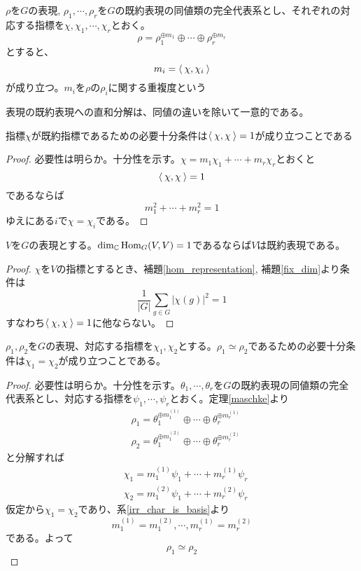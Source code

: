 \documentclass{ltjsreport}
\begin{document}
\begin{cor}\label{multiplicity}
  $\rho$を$G$の表現, $\rho_1,\cdots,\rho_r$を$G$の既約表現の同値類の完全代表系とし、それぞれの対応する指標を$\chi,\chi_1,\cdots,\chi_r$とおく。
  \[
  \rho=\rho_1^{\oplus m_1}\oplus\cdots\oplus\rho_r^{\oplus m_r}  
  \]
  とすると、
  \[
  m_i=\langle\:\chi,\chi_i\:\rangle
  \]
  が成り立つ。$m_i$を$\rho$の$\rho_i$に関する重複度という
\end{cor}

\begin{cor}
  表現の既約表現への直和分解は、同値の違いを除いて一意的である。
\end{cor}


\begin{cor}
  指標$\chi$が既約指標であるための必要十分条件は$\langle\:\chi,\chi\:\rangle=1$が成り立つことである
\end{cor}

\begin{proof}
  必要性は明らか。十分性を示す。$\chi=m_1\chi_1+\cdots+m_r\chi_r$とおくと
  \[
  \langle\:\chi,\chi\:\rangle=1  
  \]
  であるならば
  \[
  m_1^2+\cdots+m_r^2=1  
  \]
  ゆえにある$i$で$\chi=\chi_i$である。
\end{proof}

\begin{cor}[Schurの補題の逆]\label{reverse_schur}
  $V$を$G$の表現とする。$\dim_{\mathbb{C}}\text{Hom}_G(V,V)=1$であるならば$V$は既約表現である。
\end{cor}

\begin{proof}
  $\chi$を$V$の指標とするとき、補題\ref{hom_representation}, 補題\ref{fix_dim}より条件は
  \[
  \frac{1}{|G|}\sum_{g\in G}|\chi(g)|^2=1
  \]
  すなわち$\langle\:\chi,\chi\:\rangle=1$に他ならない。
\end{proof}



\begin{cor}\label{rep_and_char}
  $\rho_1,\rho_2$を$G$の表現、対応する指標を$\chi_1,\chi_2$とする。$\rho_1\simeq \rho_2$であるための必要十分条件は$\chi_1=\chi_2$が成り立つことである。
\end{cor}

\begin{proof}
  必要性は明らか。十分性を示す。$\theta_1,\cdots, \theta_r$を$G$の既約表現の同値類の完全代表系とし、対応する指標を$\psi_1,\cdots,\psi_r$とおく。定理\ref{maschke}より
  \begin{align*}
    &\rho_1=\theta_1^{\oplus m^{(1)}_1}\oplus\cdots\oplus\theta_r^{\oplus m^{(1)}_r}\\
    &\rho_2=\theta_1^{\oplus m^{(2)}_1}\oplus\cdots\oplus\theta_r^{\oplus m^{(2)}_r}
  \end{align*}
  と分解すれば
  \begin{align*}
    &\chi_1=m^{(1)}_1\psi_1+\cdots+m^{(1)}_r\psi_r\\
    &\chi_2=m^{(2)}_1\psi_1+\cdots+m^{(2)}_r\psi_r
  \end{align*}
  仮定から$\chi_1=\chi_2$であり、系\ref{irr_char_is_basis}より
  \[
  m^{(1)}_1=m^{(2)}_1,\cdots,m^{(1)}_r=m^{(2)}_r
  \]
  である。よって
  \[
  \rho_1\simeq\rho_2  
  \]
\end{proof}
\end{document}
